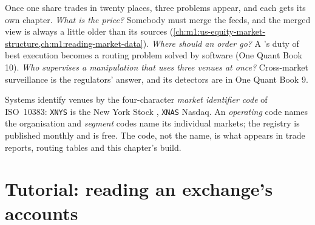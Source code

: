 Once one share trades in twenty places, three problems appear, and each
gets its own chapter. \emph{What is the price?} Somebody must merge the
feeds, and the merged view is always a little older than its sources
(\cref{ch:m1:us-equity-market-structure,ch:m1:reading-market-data}).
\emph{Where should an order go?} A 's duty of best execution becomes a
routing problem solved by software (One Quant Book 10). \emph{Who supervises
a manipulation that uses three venues at once?} Cross-market surveillance is
the regulators' answer, and its detectors are in One Quant Book 9.

\begin{remark}\label{rem:m1:exchanges-brokers-venues:mic}
Systems identify venues by the four-character \emph{market identifier code}
of ISO~10383: \texttt{XNYS} is the New York Stock , \texttt{XNAS}
Nasdaq. An \emph{operating} code names the organisation and \emph{segment}
codes name its individual markets; the registry is published monthly and is
free. The code, not the name, is what appears in trade reports, routing
tables and this chapter's build.
\end{remark}

\section{Tutorial: reading an exchange's accounts}\label{tut:m1:exchanges-brokers-venues:accounts}

